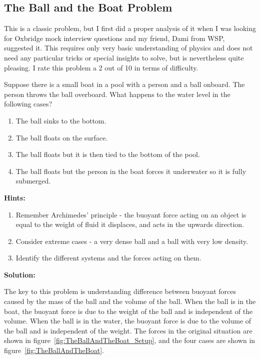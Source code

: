 \subsection{The Ball and the Boat Problem}

This is a classic problem, but I first did a proper analysis of it when I was looking for Oxbridge mock interview questions and my friend, Dami from WSP, suggested it. This requires only very basic understanding of physics and does not need any particular tricks or special insights to solve, but is nevertheless quite pleasing. I rate this problem a 2 out of 10 in terms of difficulty.

Suppose there is a small boat in a pool with a person and a ball onboard. The person throws the ball overboard. What happens to the water level in the following cases?

\begin{enumerate}
    \item The ball sinks to the bottom.
    \item The ball floats on the surface.
    \item The ball floats but it is then tied to the bottom of the pool.
    \item The ball floats but the person in the boat forces it underwater so it is fully submerged.
\end{enumerate}

\textbf{Hints:}

\begin{enumerate}
    \item Remember Archimedes' principle - the buoyant force acting on an object is equal to the weight of fluid it displaces, and acts in the upwards direction.
    \item Consider extreme cases - a very dense ball and a ball with very low density.
    \item Identify the different systems and the forces acting on them.
\end{enumerate}

\textbf{Solution:}

The key to this problem is understanding difference between buoyant forces caused by the mass of the ball and the volume of the ball. When the ball is in the boat, the buoyant force is due to the weight of the ball and is independent of the volume. When the ball is in the water, the buoyant force is due to the volume of the ball and is independent of the weight. The forces in the original situation are shown in figure~\ref{fig:TheBallAndTheBoat_Setup}, and the four cases are shown in figure~\ref{fig:TheBallAndTheBoat}.

